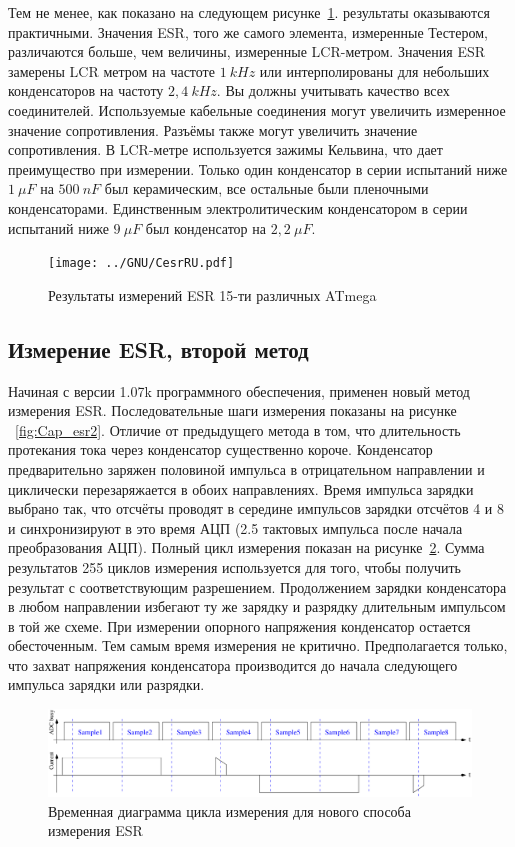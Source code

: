 Тем не менее, как показано на следующем рисунке~\ref{fig:Cesr}.
результаты оказываются практичными. Значения ESR, того же самого элемента, измеренные Тестером, различаются больше, 
чем величины, измеренные LCR-метром. Значения ESR замерены LCR метром на частоте \(1~kHz\) или интерполированы для 
небольших конденсаторов на частоту \(2,4~kHz\). Вы должны учитывать качество всех соединителей. Используемые 
кабельные соединения могут увеличить измеренное значение сопротивления. Разъёмы также могут увеличить значение 
сопротивления. В LCR-метре используется зажимы Кельвина, что дает преимущество при измерении. Только один конденсатор 
в серии испытаний ниже \(1~\mu F\) на \(500~nF\) был керамическим, все остальные были пленочными конденсаторами. 
Единственным электролитическим конденсатором в серии испытаний ниже \(9~\mu F\) был конденсатор на \(2,2~\mu F\).

\begin{figure}[H]
\centering
\texttt{[image: ../GNU/CesrRU.pdf]}
\caption{Результаты измерений ESR 15-ти различных ATmega}
\label{fig:Cesr}
\end{figure}


\subsection{Измерение ESR, второй метод}
\label{sec:ESR2}
Начиная с версии 1.07k программного обеспечения, применен новый метод измерения ESR. Последовательные шаги измерения 
показаны на рисунке ~\ref{fig:Cap_esr2}. Отличие от предыдущего метода в том, что длительность протекания тока через 
конденсатор существенно короче. Конденсатор предварительно заряжен половиной импульса в отрицательном направлении и 
циклически перезаряжается в обоих направлениях. Время  импульса зарядки выбрано так, что отсчёты проводят в середине 
импульсов зарядки отсчётов 4 и 8 и синхронизируют в это время АЦП (2.5 тактовых импульса после начала преобразования 
АЦП). Полный цикл измерения показан на рисунке~\ref{fig:Cap_esr2_timing}.
Сумма результатов 255 циклов измерения используется для того, чтобы получить результат с соответствующим разрешением. 
Продолжением зарядки конденсатора в любом направлении избегают ту же зарядку и разрядку длительным импульсом в той 
же схеме. При измерении опорного напряжения конденсатор остается обесточенным. Тем самым время измерения не критично. 
Предполагается только, что захват напряжения конденсатора производится до начала следующего импульса зарядки или 
разрядки. 

\begin{figure}[H]
  \centering
    \includegraphics[width=1.\textwidth]{../FIG/Cap_esr2_timing.pdf}
  \caption{Временная диаграмма цикла измерения для нового способа измерения ESR}
  \label{fig:Cap_esr2_timing}
\end{figure}

